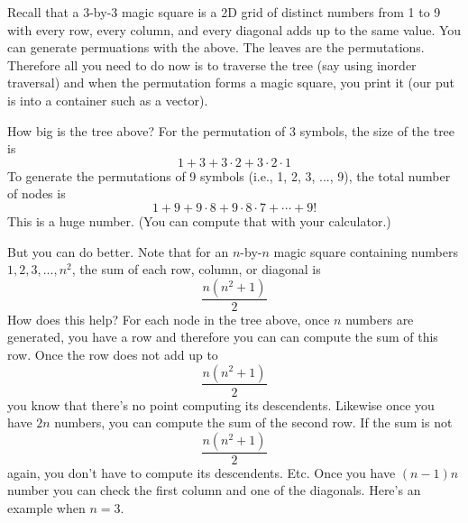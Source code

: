 Recall that a 3-by-3  magic square is a 2D grid of distinct numbers
from 1 to 9 with every row,
every column, and every diagonal adds up to the same value.
You can generate permuations with the above.
The leaves are the permutations.
Therefore all you need to do now is to traverse the tree (say using
inorder traversal) and when the permutation forms a magic square,
you print it (our put is into a container such as a vector).

How big is the tree above?
For the permutation of 3 symbols, the size of the tree is
\[
1 + 3  + 3 \cdot 2 + 3 \cdot 2 \cdot 1
\]
To generate the permutations of 9 symbols (i.e., 1, 2, 3, ..., 9),
the total number of nodes is
\[
1 + 9 + 9 \cdot 8 + 9 \cdot 8 \cdot 7 + \cdots + 9!
\]
This is a huge number. (You can compute that with your calculator.)

But you can do better.
Note that for an $n$-by-$n$ magic square containing
numbers $1, 2, 3, ..., n^2$,
the sum of each row, column, or diagonal is 
\[
\frac{n(n^2 + 1)}{2}
\]
How does this help?
For each node in the tree above, once $n$ numbers are generated,
you have a row and therefore you can can compute the sum of this row.
Once the row does not add up to
\[
\frac{n(n^2 + 1)}{2}
\]
you know that there's no point computing its descendents.
Likewise once you have $2n$ numbers, you can compute the sum of the 
second row.
If the sum is not
\[
\frac{n(n^2 + 1)}{2}
\]
again, you don't have to compute its descendents.
Etc.
Once you have $(n-1)n$ number you can check the first column and 
one of the diagonals.
Here's an example when $n = 3$.

